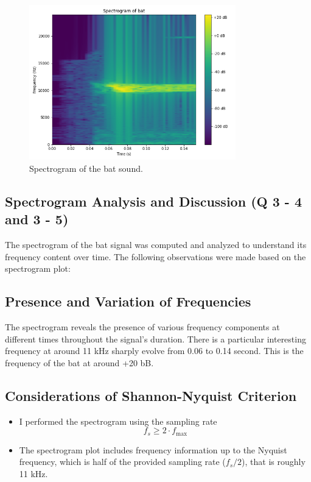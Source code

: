 \documentclass[12pt]{article}
\begin{document}
\begin{figure}[h]
    \centering
    \includegraphics[width=0.8\textwidth]{spectrogram.png}
    \caption{Spectrogram of the bat sound.}
    \label{fig:spectrogram}
\end{figure}

\subsection{Spectrogram Analysis and Discussion (Q 3 - 4 and 3 - 5)}
The spectrogram of the bat signal was computed and analyzed to understand its frequency content over time. The following observations were made based on the spectrogram plot:

\subsection*{Presence and Variation of Frequencies}
The spectrogram reveals the presence of various frequency components at different times throughout the signal's duration. There is a particular interesting frequency at around 11 kHz sharply evolve from 0.06 to 0.14 second. This is the frequency of the bat at around +20 bB.

\subsection*{Considerations of Shannon-Nyquist Criterion}

\begin{itemize}
\item I performed the spectrogram using the sampling rate \[f_s \geq 2 \cdot f_{\text{max}}\]

\item The spectrogram plot includes frequency information up to the Nyquist frequency, which is half of the provided sampling rate (\(f_s/2\)), that is roughly 11 kHz.
\end{itemize}
\end{document}
